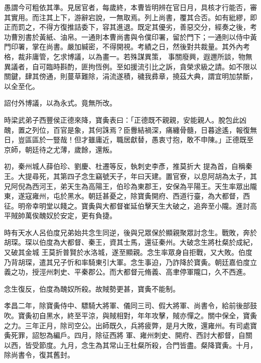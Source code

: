 \begin{pinyinscope}
 愚謂今可粗依其準。見居官者，每歲終，本曹皆明辨在官日月，具核才行能否，審其實用。而注其上下，游辭宕說，一無取焉。列上尚書，覆其合否。如有紕繆，即正而罰之，不得方復推詰委下，容其進退。既定其優劣，善惡交分，經奏之後，考功曹別書於黃紙、油帛。一通則本曹尚書與令僕印署，留於門下；一通則以侍中黃門印署，掌在尚書。嚴加緘密，不得開視。考績之日，然後對共裁量。其外內考格，裁非庸管，乞求博議，以為畫一。若殊謀異策，
 事關廢興，遐邇所談，物無異議者，自可臨時斟酌，匪拘恆例。至如援流引比之訴，貪榮求級之請。如不限以關鍵，肆其傍通，則蔓草難除，涓流遂積，穢我彞章，撓茲大典，謂宜明加禁斷，以全至化。



 詔付外博議，以為永式。竟無所改。



 時梁武弟子西豐侯正德來降，寶夤表曰：「正德既不親親，安能親人。脫包此凶醜，置之列位，百官是象，其何誅焉？臣釁結禍深，痛纏骨髓，日暮途遙，報復無日，豈區區於一豎哉！但才雖庸近，職居獻替，愚衷寸抱，敢不申陳。」正德既至京師，朝廷待之尤薄，歲餘，還叛。



 初，秦州城人薛伯珍、劉慶、杜遷等反，執刺史李彥，推莫折大
 提為首，自稱秦王。大提尋死，其第四子念生竊號天子，年曰天建。置官寮，以息阿胡為太子，其兄阿倪為西河王，弟天生為高陽王，伯珍為東郡王，安保為平陽王。天生率眾出隴東，遂寇雍州，屯於黑水。朝廷甚憂之，除寶夤開府、西道行臺，為大都督，西征。明帝幸明堂以餞之。寶夤與大都督崔延伯擊天生大破之，追奔至小隴。進討高平賊帥萬俟醜奴於安定，更有負捷。



 時有天水人呂伯度兄弟始共念生同逆，後與兄眾保於顯親聚眾討念生。戰敗，奔於胡琛。琛以伯度為大都督、秦王，資其士馬，還征秦州。大破念生將杜粲於成紀，又破其金城
 王莫折普賢於水洛城，遂至顯親。念生率眾身自拒戰，又大敗。伯度乃背胡琛，遣其兄子忻和率騎東引大軍。念生事迫，乃詐降於寶夤。朝廷嘉伯度立義之功，授涇州刺史、平秦郡公。而大都督元脩義、高聿停軍隴口，久不西進。



 念生復反，伯度為醜奴所殺。故賊勢更甚，寶夤不能制。



 孝昌二年，除寶夤侍中、驃騎大將軍、儀同三司、假大將軍、尚書令，給前後部鼓吹。寶夤初自黑水，終至平涼，與賊相對，年年攻擊，賊亦憚之。關中保全，寶夤之力。三年正月，除司空公。出師既久，兵將疲弊，是月大敗，還雍州。有司處寶夤死罪，詔恕為編戶。四月，除征西將
 軍、雍州刺史、開府、西討大都督，自關以西，皆受節度。九月，念生為其常山王杜粲所殺，合門皆盡。粲降寶夤。十月，除尚書令，復其舊封。




\end{pinyinscope}
